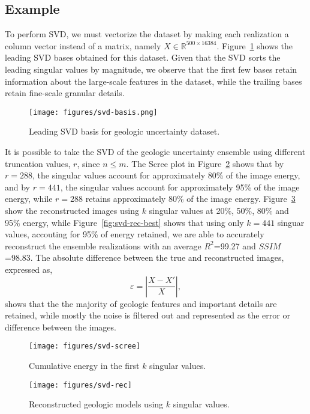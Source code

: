 \documentclass[a4paper,fleqn,12pt]{article}
\begin{document}
\subsection*{Example}
To perform SVD, we must vectorize the dataset by making each realization a column vector instead of a matrix, namely $X\in\mathbb{R}^{500\times16384}$. Figure~\ref{fig:svd-basis} shows the leading SVD bases obtained for this dataset. Given that the SVD sorts the leading singular values by magnitude, we observe that the first few bases retain information about the large-scale features in the dataset, while the trailing bases retain fine-scale granular details. 

\begin{figure}[H]
    \centering
    \texttt{[image: figures/svd-basis.png]}
    \caption{Leading SVD basis for geologic uncertainty dataset.}
    \label{fig:svd-basis}
\end{figure}

It is possible to take the SVD of the geologic uncertainty ensemble using different truncation values, $r$, since $n\leq m$. The Scree plot in Figure~\ref{fig:svd-scree} shows that by $r=288$, the singular values account for approximately 80\% of the image energy, and by $r=441$, the singular values account for approximately 95\% of the image energy, while $r=288$ retains approximately 80\% of the image energy. Figure~\ref{fig:svd-rec} show the reconstructed images using $k$ singular values at 20\%, 50\%, 80\% and 95\% energy, while Figure~\ref{fig:svd-rec-best} shows that using only $k=441$ singuar values, accouting for 95\% of energy retained, we are able to accurately reconstruct the ensemble realizations with an average $R^2$=99.27 and $SSIM$=98.83. The absolute difference between the true and reconstructed images, expressed as,
\begin{equation}
    \varepsilon = |\frac{X-X'}{X}| ,
\end{equation}
shows that the the majority of geologic features and important details are retained, while mostly the noise is filtered out and represented as the error or difference between the images.

\begin{figure}[H]
    \centering
    \texttt{[image: figures/svd-scree]}
    \caption{Cumulative energy in the first $k$ singular values.}
    \label{fig:svd-scree}
\end{figure}

\begin{figure}[H]
    \centering
    \texttt{[image: figures/svd-rec]}
    \caption{Reconstructed geologic models using $k$ singular values.}
    \label{fig:svd-rec}
\end{figure}
\end{document}
